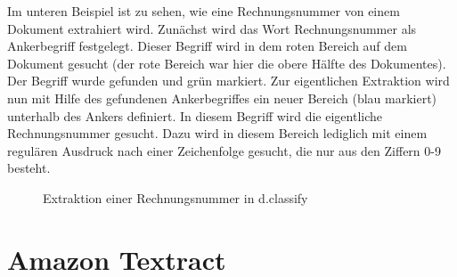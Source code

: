 \documentclass{whswinvcbook}
\begin{document}
Im unteren Beispiel ist zu sehen, wie eine Rechnungsnummer von einem Dokument extrahiert wird. Zunächst wird das Wort Rechnungsnummer als Ankerbegriff festgelegt. Dieser Begriff wird in dem roten Bereich auf dem Dokument gesucht (der rote Bereich war hier die obere Hälfte des Dokumentes). Der Begriff wurde gefunden und grün markiert. Zur eigentlichen Extraktion wird nun mit Hilfe des gefundenen Ankerbegriffes ein neuer Bereich (blau markiert) unterhalb des Ankers definiert. In diesem Begriff wird die eigentliche Rechnungsnummer gesucht. Dazu wird in diesem Bereich lediglich mit einem regulären Ausdruck nach einer Zeichenfolge gesucht, die nur aus den Ziffern 0-9 besteht.
\begin{figure}[h]
    \centering
    \hfill
    \hfill
    \caption{Extraktion einer Rechnungsnummer in d.classify}
    \label{fig-dclassify}
\end{figure}
\chapter{Amazon Textract}
\end{document}
